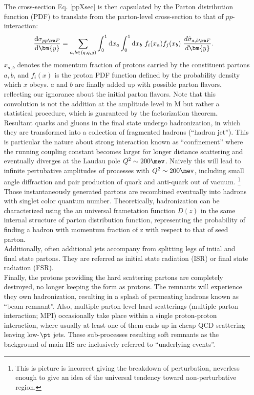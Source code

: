The cross-section Eq. \ref{ppXsec} is then capsulated by the Parton distribution function (PDF) to translate from the parton-level cross-section to that of $pp$-interaction:
\begin{align}
\frac{\mathrm{d}\sigma_{pp\ra F}}{\mathrm{d}\bm{y}} & = \sum_{a,b\in (q,\bar{q},g)} \int_0^1 \mathrm{d}x_a \int_0^1 \mathrm{d}x_b \,\, f_i (x_a) f_j (x_b) \,\, \frac{d\hat{\sigma}_{a,b \ra F}}{d\bm{y}}.
\label{ppXsecWithPDF}
\end{align}
$x_{a,b}$ denotes the momentum fraction of protons carried by the constituent partons $a,b$, and $f_i(x)$ is the proton PDF function defined by the probability density which $x$ obeys. $a$ and $b$ are finally added up with possible parton flavors, reflecting our ignorance about the initial parton flavors.
Note that this convolution is not the addition at the amplitude level in $\mathrm{M}$ but rather a statistical procedure, which is guaranteed by the factorization theorem. \\

Resultant quarks and gluons in the final state undergo hadronization, in which they are transformed into a collection of fragmented hadrons (``hadron jet''). This is particular the nature about strong interaction known as ``confinement'' where the running coupling constant becomes larger for longer distance scattering and eventually diverges at the Laudau pole $Q^2\sim 200\mev$. Naively this will lead to infinite pertubative amplitudes of processes with $Q^2\sim 200\mev$, including small angle diffraction and pair production of quark and anti-quark out of vacuum. 
\footnote{This is picture is incorrect giving the breakdown of perturbation, neverless enough to give an idea of the universal tendency toward non-perturbative region.}
Those instantaneously generated partons are recombined eventually into hadrons with singlet color quantum number. Theoretically, hadronization can be characterized using the an universal frametation function $D(z)$ in the same internal structure of parton distribution function, representing the probability of finding a hadron with momentum fraction of z with respect to that of seed parton. \\

Additionally, often additional jets accompany from splitting legs of intial and final state partons. 
They are referred as initial state radiation (ISR) or final state radiation (FSR). \\

Finally, the protons providing the hard scattering partons are completely destroyed, no longer keeping the form as protons.
The remnants will experience they own hadronization, resulting in a splash of permeating hadrons known as ``beam remnant''.
Also, multiple parton-level hard scatterings (multiple parton interaction; MPI) occasionally take place within a single proton-proton interaction, where usually at least one of them ends up in cheap QCD scattering leaving low-$\pt$ jets.
These sub-processes resulting soft remnants as the background of main HS are inclusively referred to ``underlying events''.

